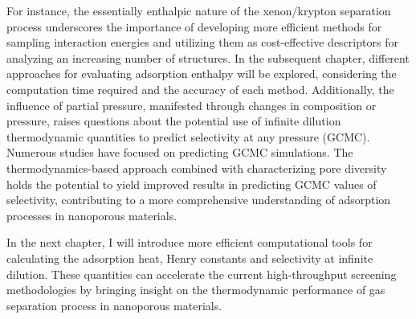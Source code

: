 \documentclass[main.tex]{subfiles}
\begin{document}
For instance, the essentially enthalpic nature of the xenon/krypton separation process underscores the importance of developing more efficient methods for sampling interaction energies and utilizing them as cost-effective descriptors for analyzing an increasing number of structures. In the subsequent chapter, different approaches for evaluating adsorption enthalpy will be explored, considering the computation time required and the accuracy of each method. Additionally, the influence of partial pressure, manifested through changes in composition or pressure, raises questions about the potential use of infinite dilution thermodynamic quantities to predict selectivity at any pressure (GCMC). Numerous studies have focused on predicting GCMC simulations.\autocite{Simon_2015,Shi_2023,Kang_2023,Li_2023} The thermodynamics-based approach combined with characterizing pore diversity holds the potential to yield improved results in predicting GCMC values of selectivity, contributing to a more comprehensive understanding of adsorption processes in nanoporous materials.

\begin{center}
\end{center}

In the next chapter, I will introduce more efficient computational tools for calculating the adsorption heat, Henry constants and selectivity at infinite dilution. These quantities can accelerate the current high-throughput screening methodologies by bringing insight on the thermodynamic performance of gas separation process in nanoporous materials.

\OnlyInSubfile{\printglobalbibliography}
\end{document}
